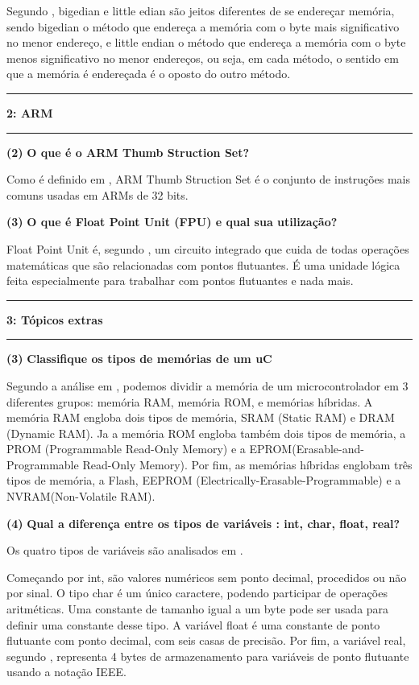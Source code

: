\documentclass[11pt]{article}
\newcommand\question[2]{\vspace{.25in}\hrule\textbf{#1: #2}\vspace{.5em}\hrule\vspace{.10in}}
\renewcommand\part[1]{\vspace{.10in}\textbf{(#1)}}
\newcommand\thumb{\vspace{.10in}\textbf{O que é o ARM Thumb Struction Set? }}
\newcommand\fpu{\vspace{.10in}\textbf{O que é Float Point Unit (FPU) e qual sua utilização? }}
\newcommand\memory{\vspace{.10in}\textbf{Classifique os tipos de memórias de um uC }}
\newcommand\variaveis{\vspace{.10in}\textbf{Qual a diferença entre os tipos de variáveis : int, char, float, real?}}
\begin{document}
Segundo \cite{endian}, bigedian e little edian são jeitos diferentes de se endereçar memória, sendo bigedian o método que endereça a memória com o byte mais significativo no menor endereço, e little endian o método que endereça a memória com o byte menos significativo no menor endereços, ou seja, em cada método, o sentido em que a memória é endereçada é o oposto do outro método.

\question{2}{ARM}

\part{2} \thumb

Como é definido em \cite{thumb}, ARM Thumb Struction Set é o conjunto de instruções mais comuns usadas em ARMs de 32 bits. 

\part{3} \fpu

Float Point Unit é, segundo \cite{technopedia}, um circuito integrado que cuida de todas operações matemáticas que são relacionadas com pontos flutuantes. É uma unidade lógica feita especialmente para trabalhar com pontos flutuantes e nada mais.

\question{3}{Tópicos extras}


\part{3} \memory

Segundo a análise em \cite{memoria}, podemos dividir a memória de um microcontrolador em 3 diferentes grupos: memória RAM, memória ROM, e memórias híbridas. A memória RAM engloba dois tipos de memória, SRAM (Static RAM) e DRAM (Dynamic RAM). Ja a memória ROM engloba também dois tipos de memória, a PROM (Programmable Read-Only Memory) e a EPROM(Erasable-and-Programmable Read-Only Memory). Por fim, as memórias híbridas englobam três tipos de memória, a Flash, EEPROM (Electrically-Erasable-Programmable) e a NVRAM(Non-Volatile RAM).

\part{4} \variaveis

Os quatro tipos de variáveis são analisados em \cite{variaveis}.

Começando por int, são valores numéricos sem ponto decimal, procedidos ou não por sinal. O tipo char é um único caractere, podendo participar de operações aritméticas. Uma constante de tamanho igual a um byte pode ser usada para definir uma constante desse tipo. A variável float é uma constante de ponto flutuante com ponto decimal, com seis casas de precisão. Por fim, a variável real, segundo \cite{real}, representa 4 bytes de armazenamento para variáveis de ponto flutuante usando a notação IEEE.

{}

\end{document}
